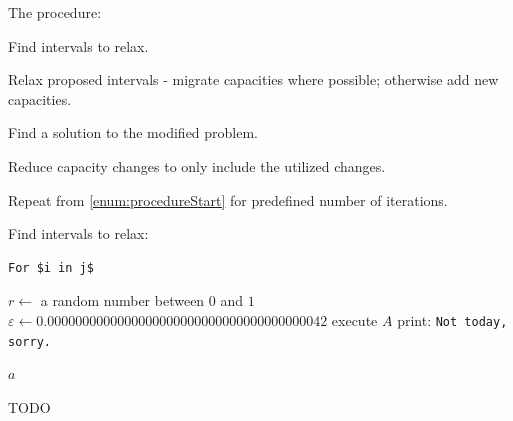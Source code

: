 The procedure:

\begin{steps}
    \item Find intervals to relax. \label{enum:procedureStart}
    \item Relax proposed intervals - migrate capacities where possible; otherwise add new capacities.
    \item Find a solution to the modified problem.
    \item Reduce capacity changes to only include the utilized changes.
    \item Repeat from \cref{enum:procedureStart} for predefined number of iterations.
\end{steps}

Find intervals to relax:

\begin{verbatim}
For $i in j$
\end{verbatim}


\algrenewcommand\algorithmicdo{\textbf{:}}
\algrenewcommand\algorithmicthen{\textbf{:}}
\algrenewcommand{}

\begin{algorithm}
\begin{algorithmic}
	\State $r \gets$ a random number between $0$ and $1$
	\State $\varepsilon \gets 0.0000000000000000000000000000000000000042$
		\State execute $A$ 
	\Else
		\State print: \texttt{Not today, sorry.}
        \EndIf


    \State $a$
\EndFunction
\end{algorithmic}
\caption{TODO}
\label{alg:findIntervalsToRelax}
\end{algorithm}